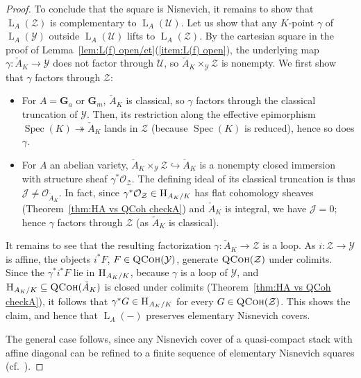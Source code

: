 \documentclass[12pt, oneside]{amsart}
\numberwithin{equation}{section}
\theoremstyle{remark}
\theoremstyle{plain}
\DeclareMathOperator{\QCoh}{\textsc{QCoh}}
\newcommand{\Hcat}{\textup{\textsc{H}}}
\newcommand{\Loop}{\operatorname{L}}
\newcommand{\OO}{\mathcal{O}}
\newcommand{\YY}{\mathcal{Y}}
\newcommand{\ZZ}{\mathcal{Z}}
\DeclareMathOperator{\spc}{Spec}
\newcommand{\GGa}{\mathbf{G}_{a}}
\newcommand{\GGm}{\mathbf{G}_{m}}
\newcommand{\UU}{\mathcal{U}}
\begin{document}
\begin{proof}
  To conclude that the square is Nisnevich, it remains to show that $\Loop_A(\ZZ)$ is complementary to $\Loop_A(\UU)$.
  Let us show that any $K$-point $\gamma$ of $\Loop_A(\YY)$ outside $\Loop_A(\mathcal{U})$ lifts to $\Loop_A(\mathcal{Z})$.
  By the cartesian square in the proof of Lemma~\ref{lem:L(f) open/et}(\ref{item:L(f) open}), the underlying map $\gamma : \check{A}_K \to \YY$ does not factor through $\UU$, so $\check{A}_K \times_{\YY} \ZZ$ is nonempty.
  We first show that $\gamma$ factors through $\ZZ$:
  \begin{itemize}
	\item
  For $A = \GGa$ or $\GGm$, $\check{A}_K$ is classical, so $\gamma$ factors through the classical truncation of $\YY$.
  Then, its restriction along the effective epimorphism $\spc(K) \twoheadrightarrow \check{A}_K$ lands in $\ZZ$ (because $\spc(K)$ is reduced), hence so does $\gamma$.

  \item
  For $A$ an abelian variety, $\check{A}_K \times_{\YY} \ZZ \hookrightarrow \check{A}_K$ is a nonempty closed immersion with structure sheaf $\gamma^*\OO_{\ZZ}$.
  The defining ideal of its classical truncation is thus $\mathcal{J} \neq \OO_{\check{A}_K}$.
  In fact, since $\gamma^*\OO_{\ZZ} \in \Hcat_{A_K/K}$ has flat cohomology sheaves (Theorem~\ref{thm:HA vs QCoh checkA}) and $\check{A}_K$ is integral, we have $\mathcal{J} = 0$; hence $\gamma$ factors through $\ZZ$ (as $\check{A}_K$ is classical).
  \end{itemize}
  It remains to see that the resulting factorization $\gamma : \check{A}_K \to \ZZ$ is a loop.
  As $i : \ZZ \to \YY$ is affine, the objects $i^*F$, $F \in \QCoh(\YY)$, generate $\QCoh(\ZZ)$ under colimits.
  Since the $\gamma^*i^*F$ lie in $\Hcat_{A_K/K}$, because $\gamma$ is a loop of $\YY$, and $\Hcat_{A_K/K} \subseteq \QCoh(\check{A}_K)$ is closed under colimits (Theorem~\ref{thm:HA vs QCoh checkA}), it follows that $\gamma^*G \in \Hcat_{A_K/K}$ for every $G \in \QCoh(\ZZ)$.
  This shows the claim, and hence that $\Loop_A(-)$ preserves elementary Nisnevich covers.

  The general case follows, since any Nisnevich cover of a quasi-compact stack with affine diagonal can be refined to a finite sequence of elementary Nisnevich squares (cf.\ \cite[Rem.~5.5]{Rydh11}).
\end{proof}
\end{document}
